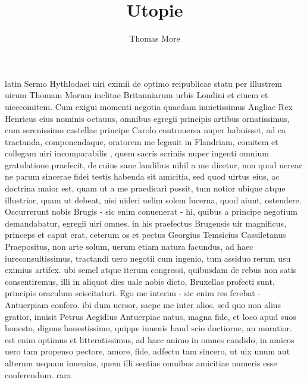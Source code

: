 \documentclass[12pt,a4paper]{book}
\renewenvironment{latin}
    	{\begin{hyphenrules}{latin}}
    	{\end{hyphenrules}}
\begin{document}
\author{Thomas More}
\title{Utopie}
\date{}

\maketitle


\begin{pages}
    \begin{Leftside} 
    \begin{latin}
        \beginnumbering
        \pstart
        Sermo  Hythlodaei uiri eximii de optimo reipublicae statu per illustrem uirum Thomam Morum inclitae Britanniarum urbis Londini et ciuem et uicecomitem. 
Cum  exigui momenti negotia quaedam inuictissimus Angliae Rex Henricus eius 
nominis octauus, omnibus egregii principis artibus ornatissimus, cum serenissimo 
castellae principe Carolo controuersa nuper habuisset, ad ea tractanda, 
componendaque, oratorem me legauit in Flandriam, comitem et collegam uiri 
incomparabilis , quem sacris scriniis nuper ingenti omnium 
gratulatione praefecit, de cuius sane laudibus nihil a me dicetur, non quod 
uerear ne parum sincerae fidei testis habenda sit amicitia, sed quod uirtus 
eius, ac doctrina maior est, quam ut a me praedicari possit, tum notior ubique 
atque illustrior, quam ut debeat, nisi uideri uelim solem lucerna, quod aiunt, 
ostendere. 
\pend
\pstart
Occurrerunt nobis Brugis - sic enim conuenerat - hi, quibus a principe negotium 
demandabatur, egregii uiri omnes. in his praefectus Brugensis uir magnificus, 
princeps et caput erat, ceterum os et pectus Georgius Temsicius Cassiletanus 
Praepositus, non arte solum, uerum etiam natura facundus, ad haec 
iureconsultissimus, tractandi uero negotii cum ingenio, tum assiduo rerum usu 
eximius artifex. ubi semel atque iterum congressi, quibusdam de rebus non satis 
consentiremus, illi in aliquot dies uale nobis dicto, Bruxellas profecti sunt, 
principis oraculum sciscitaturi. 
\pend
\pstart
Ego me interim - sic enim res ferebat - Antuerpiam confero. ibi dum uersor, 
saepe me inter alios, sed quo non alius gratior, inuisit Petrus Aegidius 
Antuerpiae natus, magna fide, et loco apud suos honesto, dignus honestissimo, 
quippe iuuenis haud scio doctiorne, an moratior. est enim optimus et 
litteratissimus, ad haec animo in omnes candido, in amicos uero tam propenso 
pectore, amore, fide, adfectu tam sincero, ut uix unum aut alterum usquam 
inuenias, quem illi sentias omnibus amicitiae numeris esse conferendum. rara 

\end{latin}
\end{Leftside}
\end{pages}
\end{document}
